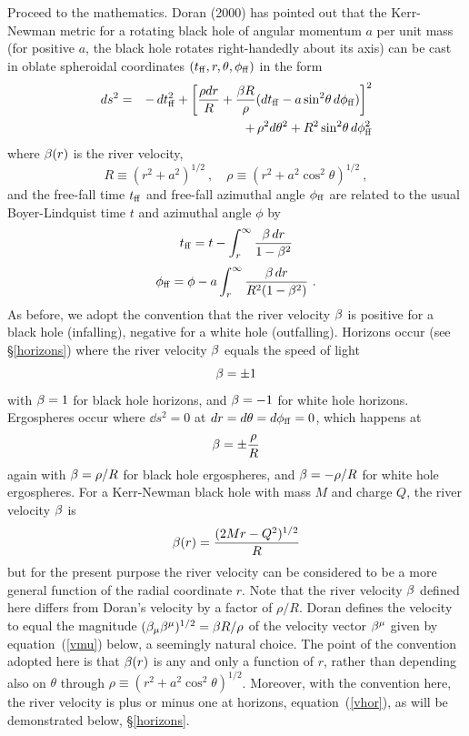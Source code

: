 \documentclass[twocolumn,showpacs,preprintnumbers,amsmath,amssymb,prb]{revtex4}
\begin{document}
Proceed to the mathematics.
Doran (2000)
\cite{Doran}
has pointed out that the
Kerr-Newman metric for a rotating black hole
of angular momentum $a$ per unit mass
(for positive $a$,
the black hole rotates right-handedly about its axis)
can be cast
in oblate spheroidal coordinates
$(t_{\rm ff},r,\theta,\phi_{\rm ff})$
in the form
\begin{eqnarray}
\label{doranmetric}
  d s^2
  &=&
  - \, d t_{\rm ff}^2
  + \left[ {\rho d r \over R}
  + {\beta R \over \rho} (d t_{\rm ff} - a \sin^2\!\theta \, d\phi_{\rm ff}) \right]^2
\nonumber
\\
  &&
  + \, \rho^2 d\theta^2 + R^2 \sin^2\!\theta \, d\phi_{\rm ff}^2
\end{eqnarray}
where $\beta(r)$ is the river velocity,
\begin{equation}
  R \equiv (r^2 + a^2)^{1/2}
  \ , \quad
  \rho \equiv (r^2 + a^2 \cos^2 \theta)^{1/2}
  \ ,
\end{equation}
and the free-fall time $t_{\rm ff}$ and
free-fall azimuthal angle $\phi_{\rm ff}$
are related to the usual Boyer-Lindquist time $t$ and azimuthal angle $\phi$ by
\begin{equation}
  t_{\rm ff} = t - \int_r^\infty {\beta\, dr \over 1 - \beta^2}
\end{equation}
\begin{equation}
  \phi_{\rm ff} = \phi - a \int_r^\infty {\beta\, dr \over R^2 (1 - \beta^2)}
  \ .
\end{equation}
As before,
we adopt the convention that the river velocity $\beta$
is positive for a black hole
(infalling),
negative for a white hole
(outfalling).
Horizons occur (see \S\ref{horizons})
where the river velocity $\beta$ equals the speed of light
\begin{equation}
\label{vhor}
  \beta = \pm 1
\end{equation}
with $\beta = 1$ for black hole horizons,
and $\beta = -1$ for white hole horizons.
Ergospheres occur where
$\dd s^2 = 0$ at $d r = d\theta = d\phi_{\rm ff} = 0$,
which happens at
\begin{equation}
  \beta = \pm {\rho \over R}
\end{equation}
again with $\beta = \rho / R$ for black hole ergospheres,
and $\beta = - \rho / R$ for white hole ergospheres.
For a Kerr-Newman black hole with mass $M$ and charge $Q$,
the river velocity $\beta$ is
\begin{equation}
\label{vffkerrnewman}
  \beta(r) = {( 2 M r - Q^2 )^{1/2} \over R}
\end{equation}
but for the present purpose
the river velocity can be considered to be a more general function of
the radial coordinate $r$.
Note that the river velocity $\beta$ defined here differs from
Doran's \cite{Doran} velocity by a factor of $\rho/R$.
Doran defines the velocity to equal the magnitude
$( \beta_\mu \beta^\mu )^{1/2} = \beta R / \rho$ of the
velocity vector $\beta^\mu$ given by equation~(\ref{vmu}) below,
a seemingly natural choice.
The point of the convention adopted here is that $\beta(r)$
is any and only a function of $r$,
rather than depending also on $\theta$
through $\rho \equiv (r^2 + a^2 \cos^2 \theta)^{1/2}$.
Moreover, with the convention here,
the river velocity is plus or minus one at horizons,
equation~(\ref{vhor}),
as will be demonstrated below, \S\ref{horizons}.
\end{document}

